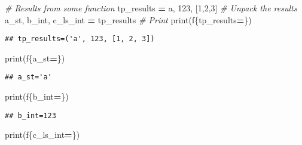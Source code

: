 \documentclass[
]{book}
\newenvironment{Shaded}{\begin{snugshade}}{\end{snugshade}}
\newcommand{\BuiltInTok}[1]{#1}
\newcommand{\CommentTok}[1]{\textcolor[rgb]{0.56,0.35,0.01}{\textit{#1}}}
\newcommand{\DecValTok}[1]{\textcolor[rgb]{0.00,0.00,0.81}{#1}}
\newcommand{\NormalTok}[1]{#1}
\newcommand{\OperatorTok}[1]{\textcolor[rgb]{0.81,0.36,0.00}{\textbf{#1}}}
\newcommand{\SpecialCharTok}[1]{\textcolor[rgb]{0.00,0.00,0.00}{#1}}
\newcommand{\SpecialStringTok}[1]{\textcolor[rgb]{0.31,0.60,0.02}{#1}}
\newcommand{\StringTok}[1]{\textcolor[rgb]{0.31,0.60,0.02}{#1}}
\begin{document}
\begin{Shaded}
\begin{Highlighting}[]
\CommentTok{\# Results from some function}
\NormalTok{tp\_results }\OperatorTok{=} \StringTok{\textquotesingle{}a\textquotesingle{}}\NormalTok{, }\DecValTok{123}\NormalTok{,  [}\DecValTok{1}\NormalTok{,}\DecValTok{2}\NormalTok{,}\DecValTok{3}\NormalTok{]}
\CommentTok{\# Unpack the results}
\NormalTok{a\_st, b\_int, c\_ls\_int }\OperatorTok{=}\NormalTok{ tp\_results}
\CommentTok{\# Print}
\BuiltInTok{print}\NormalTok{(}\SpecialStringTok{f\textquotesingle{}}\SpecialCharTok{\{}\NormalTok{tp\_results}\OperatorTok{=}\SpecialCharTok{\}}\SpecialStringTok{\textquotesingle{}}\NormalTok{)}
\end{Highlighting}
\end{Shaded}

\begin{verbatim}
## tp_results=('a', 123, [1, 2, 3])
\end{verbatim}

\begin{Shaded}
\begin{Highlighting}[]
\BuiltInTok{print}\NormalTok{(}\SpecialStringTok{f\textquotesingle{}}\SpecialCharTok{\{}\NormalTok{a\_st}\OperatorTok{=}\SpecialCharTok{\}}\SpecialStringTok{\textquotesingle{}}\NormalTok{)}
\end{Highlighting}
\end{Shaded}

\begin{verbatim}
## a_st='a'
\end{verbatim}

\begin{Shaded}
\begin{Highlighting}[]
\BuiltInTok{print}\NormalTok{(}\SpecialStringTok{f\textquotesingle{}}\SpecialCharTok{\{}\NormalTok{b\_int}\OperatorTok{=}\SpecialCharTok{\}}\SpecialStringTok{\textquotesingle{}}\NormalTok{)}
\end{Highlighting}
\end{Shaded}

\begin{verbatim}
## b_int=123
\end{verbatim}

\begin{Shaded}
\begin{Highlighting}[]
\BuiltInTok{print}\NormalTok{(}\SpecialStringTok{f\textquotesingle{}}\SpecialCharTok{\{}\NormalTok{c\_ls\_int}\OperatorTok{=}\SpecialCharTok{\}}\SpecialStringTok{\textquotesingle{}}\NormalTok{)}
\end{Highlighting}
\end{Shaded}
\end{document}
